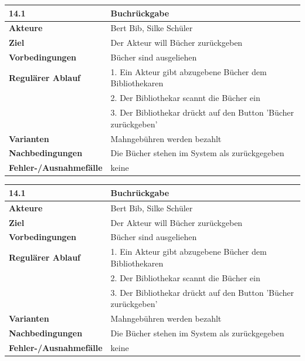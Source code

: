 \documentclass[fontsize=12pt,paper=a4,twoside]{scrartcl}
\begin{document}
\begin{table}[htbp]
\label{14.1}
\begin{tabular}{|l|p{10cm}|}
\hline 
\textbf{14.1} & \textbf{Buchrückgabe} \\ \hline
\textbf{Akteure} & Bert Bib, Silke Schüler\\ \hline
\textbf{Ziel} & Der Akteur will Bücher zurückgeben \\ \hline
\textbf{Vorbedingungen} & Bücher sind ausgeliehen \\ \hline
\textbf{Regulärer Ablauf} & 
1. Ein Akteur gibt abzugebene Bücher dem Bibliothekaren \\
&2. Der Bibliothekar scannt die Bücher ein\\
&3. Der Bibliothekar drückt auf den Button 'Bücher zurückgeben'\\
\hline
\textbf{Varianten} & 
Mahngebühren werden bezahlt \\ \hline
\textbf{Nachbedingungen} & Die Bücher stehen im System als zurückgegeben\\ \hline
\textbf{Fehler-/Ausnahmefälle} & keine\\
\hline
\end{tabular}
\end{table}

\begin{table}[htbp]
\label{14.1}
\begin{tabular}{|l|p{10cm}|}
\hline 
\textbf{14.1} & \textbf{Buchrückgabe} \\ \hline
\textbf{Akteure} & Bert Bib, Silke Schüler\\ \hline
\textbf{Ziel} & Der Akteur will Bücher zurückgeben \\ \hline
\textbf{Vorbedingungen} & Bücher sind ausgeliehen \\ \hline
\textbf{Regulärer Ablauf} & 
1. Ein Akteur gibt abzugebene Bücher dem Bibliothekaren \\
&2. Der Bibliothekar scannt die Bücher ein\\
&3. Der Bibliothekar drückt auf den Button 'Bücher zurückgeben'\\
\hline
\textbf{Varianten} & 
Mahngebühren werden bezahlt \\ \hline
\textbf{Nachbedingungen} & Die Bücher stehen im System als zurückgegeben\\ \hline
\textbf{Fehler-/Ausnahmefälle} & keine\\
\hline
\end{tabular}
\end{table}
\end{document}
